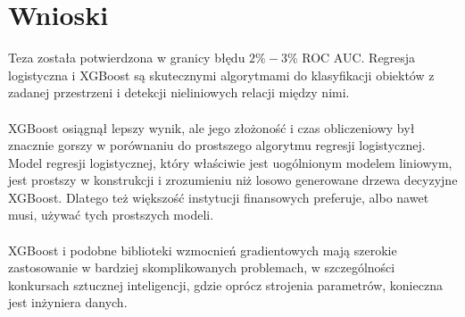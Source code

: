 \documentclass[12pt,a4paper]{article}
\begin{document}
\section*{Wnioski}
Teza została potwierdzona w granicy błędu $2\%-3\%$ ROC AUC. Regresja logistyczna i XGBoost są skutecznymi algorytmami do klasyfikacji obiektów z zadanej przestrzeni i detekcji nieliniowych relacji między nimi.
\\
\\
XGBoost osiągnął lepszy wynik, ale jego złożoność i czas obliczeniowy był znacznie gorszy w porównaniu do prostszego algorytmu regresji logistycznej. Model regresji logistycznej, który właściwie jest uogólnionym modelem liniowym, jest prostszy w konstrukcji i zrozumieniu niż losowo generowane drzewa decyzyjne XGBoost. Dlatego też większość instytucji finansowych preferuje, albo nawet musi, używać tych prostszych modeli.
\\
\\
XGBoost i podobne biblioteki wzmocnień gradientowych mają szerokie zastosowanie w bardziej skomplikowanych problemach, w szczególności konkursach sztucznej inteligencji, gdzie oprócz strojenia parametrów, konieczna jest inżyniera danych.

\nocite{*}

{}
\end{document}
